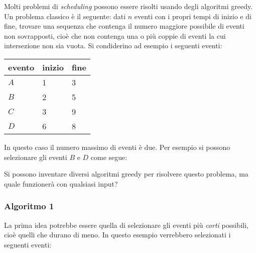 Molti problemi di \emph{scheduling} possono essere risolti
usando degli algoritmi greedy.
Un problema classico è il seguente:
dati $n$ eventi con i propri tempi di inizio e di fine,
trovare una sequenza che contenga il numero maggiore possibile
di eventi non sovrapposti, cioè che non contenga una o più 
coppie di eventi la cui intersezione non sia vuota.
Si condiderino ad esempio i seguenti eventi:
\begin{center}
\begin{tabular}{lll}
evento & inizio & fine \\
\hline
$A$ & 1 & 3 \\
$B$ & 2 & 5 \\
$C$ & 3 & 9 \\
$D$ & 6 & 8 \\
\end{tabular}
\end{center}
In questo caso il numero massimo di eventi è due.
Per esempio si possono selezionare gli eventi $B$ e $D$
come segue:
\begin{center}
\end{center}

Si possono inventare diversi algoritmi greedy per risolvere
questo problema, ma quale funzionerà con qualsiasi input?

\subsubsection*{Algoritmo 1}

La prima idea potrebbe essere quella di selezionare gli eventi
più \emph{corti} possibili, cioè quelli che durano di meno.
In questo esempio verrebbero selezionati i seguenti eventi:
\begin{center}
\end{center}

